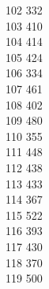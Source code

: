 { 102	332 \\
 103	410 \\
 104	414 \\
 105	424 \\
 106	334 \\
 107	461 \\
 108	402 \\
 109	480 \\
 110	355 \\
 111	448 \\
 112	438 \\
 113	433 \\
 114	367 \\
 115	522 \\
 116	393 \\
 117	430 \\
 118	370 \\
 119	500 \\
}
